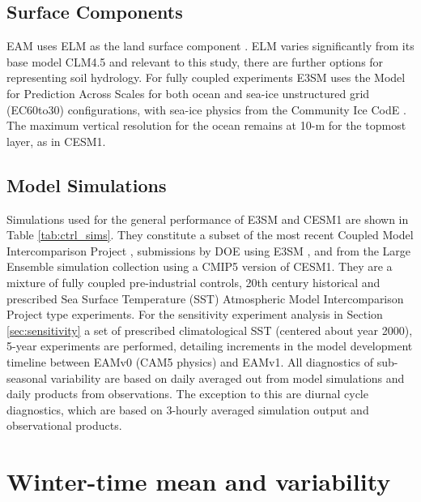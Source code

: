 \documentclass[draft,ms]{AGUTeX}
\begin{document}
\begin{article}
\subsection{Surface Components}

EAM uses ELM as the land surface component \citep{Ricciuto2018}. ELM varies significantly from its base model CLM4.5 and relevant to this study, there are further options for representing soil hydrology. For fully coupled experiments E3SM uses the Model for Prediction Across Scales \citep[MPAS, ][]{Ringler2013} for both ocean and sea-ice unstructured grid (EC60to30) configurations, with sea-ice physics from the Community Ice CodE \citep[CICE][]{HunkeE.C.Lipscomb2010}. The maximum vertical resolution for the ocean remains at 10-m for the topmost layer, as in CESM1.

\subsection {Model Simulations}

Simulations used for the general performance of E3SM and CESM1 are shown in Table \ref{tab:ctrl_sims}. They constitute a subset of the most recent Coupled Model Intercomparison Project \cite[CMIP6,][]{Eyring2016}, submissions by DOE using E3SM \citep{Golaz2019}, and from the Large Ensemble simulation collection \citep{CESM_LENS} using a CMIP5 \citep{CMIP5} version of CESM1. They are a mixture of fully coupled pre-industrial controls, 20th century historical and prescribed Sea Surface Temperature (SST) Atmospheric Model Intercomparison Project   \citep[AMIP,][]{Gates1992} type experiments. For the sensitivity experiment analysis in Section \ref{sec:sensitivity} a set of prescribed climatological SST (centered about year 2000), 5-year experiments are performed, detailing increments in the model development timeline between EAMv0 (CAM5 physics) and EAMv1. All diagnostics of sub-seasonal variability are based on daily averaged out from model simulations and daily products from observations. The exception to this are diurnal cycle diagnostics, which are based on 3-hourly averaged simulation output and observational products. 


\section{Winter-time mean and variability}
\label{sec:mean_var}


\end{article}
\end{document}
